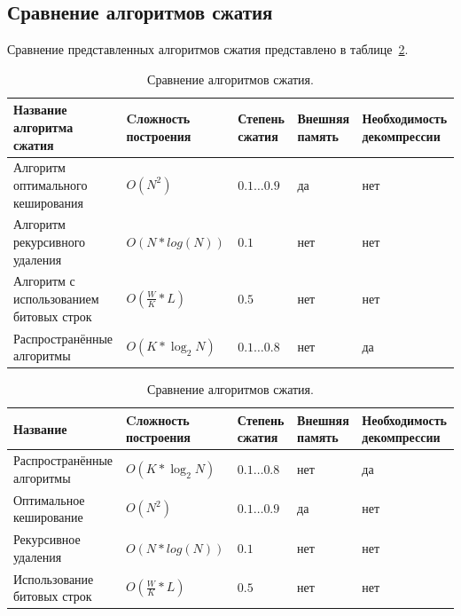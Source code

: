 \documentclass[oneside,final,12pt]{extarticle}
\begin{document}
        \subsection{Сравнение алгоритмов сжатия}
             Сравнение представленных алгоритмов сжатия представлено в таблице~\ref{tab:tab1}.
        \begin{table}[ht]
            \caption{Сравнение алгоритмов сжатия.}\label{tab:tab1}
            \begin{tabular}{|m{4.3cm}|m{2.5cm}|m{2cm}|m{2cm}|m{3.3cm}|}
                \hline
                \bf Название алгоритма сжатия & \bf Cложность построения & \bf Степень сжатия & \bf Внешняя память & \bf Необходимость декомпрессии \\
                \hline
                Алгоритм оптимального кеширования & $O(N^2)$ & \(0.1 \ldots 0.9\) & да & нет \\
                \hline
                Алгоритм рекурсивного удаления & $O(N*log(N))$ & \(0.1\) & нет & нет \\
                \hline
                Алгоритм с использованием битовых строк & $O(\frac{W}{K}*L)$ & \(0.5\) & нет & нет \\
                \hline
                Распространённые алгоритмы & $O(K*\log_2{N})$ & \(0.1 \ldots 0.8\) & нет & да \\
                \hline
            \end{tabular}
        \end{table}
        \fi
        \begin{table}[!t]
            \centering
            \caption{Сравнение алгоритмов сжатия.}\label{tab:tab1}
            \begin{tabularx}{\textwidth}{m{4.3cm}m{2.5cm}m{2cm}m{2cm}m{3.3cm}}
                \toprule
                \bf Название & \bf Cложность построения & \bf Степень сжатия & \bf Внешняя память & \bf Необходимость декомпрессии \\
                \midrule
                Распространённые алгоритмы & $O(K*\log_2{N})$ & \(0.1 \ldots 0.8\) & нет & да \\
                Оптимальное кеширование & $O(N^2)$ & \(0.1 \ldots 0.9\) & да & нет \\
                Рекурсивное удаления & $O(N*log(N))$ & \(0.1\) & нет & нет \\
                Использование битовых строк & $O(\frac{W}{K}*L)$ & \(0.5\) & нет & нет \\
                \bottomrule
            \end{tabularx}
        \end{table}
        
\end{document}
